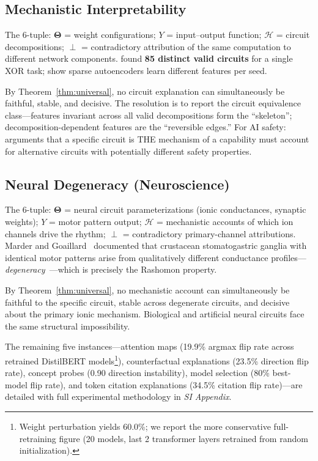 \documentclass[twocolumn]{article}
\newcommand{\Params}{\mathbf{\Theta}}
\newcommand{\sH}{\mathcal{H}}
\newcommand{\incomp}{\perp}
\begin{document}
\subsection{Mechanistic Interpretability}
\label{sec:instance-mi}

The 6-tuple: $\Params$ = weight configurations; $Y$ = input--output function; $\sH$ = circuit decompositions; $\incomp$ = contradictory attribution of the same computation to different network components. \cite{meloux2025everything} found \textbf{85 distinct valid circuits} for a single XOR task; \cite{paulo2025sae} show sparse autoencoders learn different features per seed.

By Theorem~\ref{thm:universal}, no circuit explanation can simultaneously be faithful, stable, and decisive. The resolution is to report the circuit equivalence class---features invariant across all valid decompositions form the ``skeleton''; decomposition-dependent features are the ``reversible edges.'' For AI safety: arguments that a specific circuit is THE mechanism of a capability must account for alternative circuits with potentially different safety properties.

\subsection{Neural Degeneracy (Neuroscience)}
\label{sec:instance-neuro}

The 6-tuple: $\Params$ = neural circuit parameterizations (ionic conductances, synaptic weights); $Y$ = motor pattern output; $\sH$ = mechanistic accounts of which ion channels drive the rhythm; $\incomp$ = contradictory primary-channel attributions. Marder and Goaillard~\cite{marder2006variability} documented that crustacean stomatogastric ganglia with identical motor patterns arise from qualitatively different conductance profiles---\emph{degeneracy}~\cite{edelman2001degeneracy}---which is precisely the Rashomon property.

By Theorem~\ref{thm:universal}, no mechanistic account can simultaneously be faithful to the specific circuit, stable across degenerate circuits, and decisive about the primary ionic mechanism. Biological and artificial neural circuits face the same structural impossibility.

\medskip

\noindent
The remaining five instances---attention maps (19.9\% argmax flip rate
across retrained DistilBERT models\footnote{Weight perturbation yields 60.0\%;
we report the more conservative full-retraining figure (20 models, last 2
transformer layers retrained from random initialization).}),
counterfactual explanations (23.5\%
direction flip rate), concept probes (0.90 direction instability), model
selection (80\% best-model flip rate), and token citation explanations
(34.5\% citation flip rate)---are detailed with full experimental
methodology in \emph{SI Appendix}.
\end{document}
